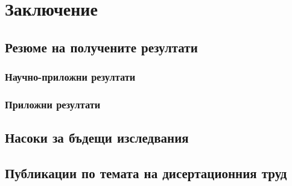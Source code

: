 \chapter*{Заключение}

\newpage
\section*{Резюме на получените резултати}

\subsection*{Научно-приложни резултати}

\subsection*{Приложни резултати}

\newpage
\section*{Насоки за бъдещи изследвания}

\newpage
\section*{Публикации по темата на дисертационния труд}

